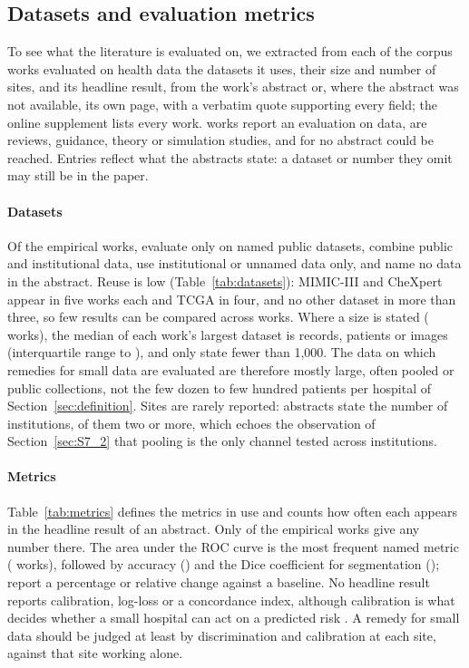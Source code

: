 \documentclass[acmsmall,screen,review]{acmart}
\theoremstyle{acmdefinition}
\begin{document}
\subsection{Datasets and evaluation metrics}\label{sec:datasets}

To see what the literature is evaluated on, we extracted from each of the \CxHealth{} corpus works evaluated on health data the datasets it uses, their size and number of sites, and its headline result, from the work's abstract or, where the abstract was not available, its own page, with a verbatim quote supporting every field; the online supplement lists every work. \CxEmpirical{} works report an evaluation on data, \CxNotEmp{} are reviews, guidance, theory or simulation studies, and for \CxNoSource{} no abstract could be reached. Entries reflect what the abstracts state: a dataset or number they omit may still be in the paper.

\paragraph{Datasets} Of the \CxEmpirical{} empirical works, \CxPublic{} evaluate only on named public datasets, \CxBoth{} combine public and institutional data, \CxInst{} use institutional or unnamed data only, and \CxNoData{} name no data in the abstract. Reuse is low (Table~\ref{tab:datasets}): MIMIC-III \cite{johnson2016mimic} and CheXpert \cite{irvin2019chexpert} appear in five works each and TCGA in four, and no other dataset in more than three, so few results can be compared across works. Where a size is stated (\CxWithSize{} works), the median of each work's largest dataset is \CxSizeMedian{} records, patients or images (interquartile range \CxSizeQOne{} to \CxSizeQThree), and only \CxSizeUnderThousand{} state fewer than 1,000. The data on which remedies for small data are evaluated are therefore mostly large, often pooled or public collections, not the few dozen to few hundred patients per hospital of Section~\ref{sec:definition}. Sites are rarely reported: \CxSitesStated{} abstracts state the number of institutions, \CxMultiSite{} of them two or more, which echoes the observation of Section~\ref{sec:S7_2} that pooling is the only channel tested across institutions.

\paragraph{Metrics} Table~\ref{tab:metrics} defines the metrics in use and counts how often each appears in the headline result of an abstract. Only \CxWithResult{} of the \CxEmpirical{} empirical works give any number there. The area under the ROC curve is the most frequent named metric (\CxMetAuc{} works), followed by accuracy (\CxMetAcc) and the Dice coefficient for segmentation (\CxMetDice); \CxMetRel{} report a percentage or relative change against a baseline. No headline result reports calibration, log-loss or a concordance index, although calibration is what decides whether a small hospital can act on a predicted risk \cite{vancalster2019calibration}. A remedy for small data should be judged at least by discrimination and calibration at each site, against that site working alone.
\end{document}

